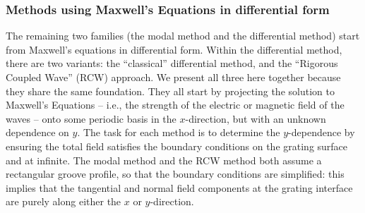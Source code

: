 \subsubsection{Methods using Maxwell's Equations in differential form}
The remaining two families (the modal method and the differential method) start from Maxwell's equations in differential form.  Within the differential method, there are two variants: the ``classical'' differential method, and the ``Rigorous Coupled Wave'' (RCW) approach.  We present all three here together because they share the same foundation.  They all start by projecting the solution to Maxwell's Equations -- i.e., the strength of the electric or magnetic field of the waves -- onto some periodic basis in the $x$-direction, but with an unknown dependence on $y$.  The task for each method is to determine the $y$-dependence by ensuring the total field satisfies the boundary conditions on the grating surface and at infinite.  The modal method and the RCW method both assume a rectangular groove profile, so that the boundary conditions are simplified: this implies that the tangential and normal field components at the grating interface are purely along either the $x$ or $y$-direction.
